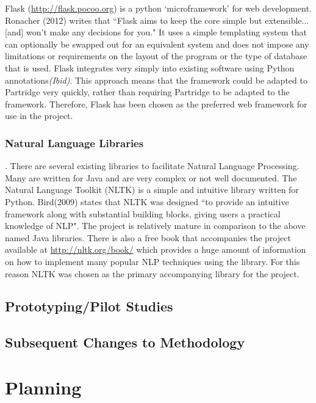 \documentclass[12pt,a4paper]{article}
\begin{document}
Flask (\url{http://flask.pocoo.org}) is a python `microframework' for web
development. Ronacher (2012) writes that ``Flask aims to keep the core simple
but extensible...[and] won't make any decisions for you\cite{flask2012}." It
uses a simple templating system that can optionally be swapped out for an
equivalent system and does not impose any limitations or requirements on the
layout of the program or the type of database that is used. Flask integrates
very simply into existing software using Python annotations\emph{(Ibid)}. This approach
means that the framework could be adapted to Partridge very quickly, rather
than requiring Partridge to be adapted to the framework. Therefore, Flask has
been chosen as the preferred web framework for use in the project.

\subsubsection{Natural Language Libraries} \label{sec:libschoice}.  There are
several existing libraries to facilitate Natural Language Processing.  Many are
written for Java \cite{mallet2002}\cite{cunningham2011text} and are very
complex or not well documented. The Natural Language Toolkit (NLTK) is a simple
and intuitive library written for Python. Bird(2009) states that NLTK was
designed ``to provide an intuitive framework along with substantial building
blocks, giving users a practical knowledge of NLP\cite{bird2009natural}". The
project is relatively mature in comparison to the above named Java libraries.
There is also a free book that accompanies the project available at
\url{http://nltk.org/book/} which provides a huge amount of information on how
to implement many popular NLP techniques using the library. For this reason
NLTK was chosen as the primary accompanying library for the project.

\subsection{Prototyping/Pilot Studies}

\subsection{Subsequent Changes to Methodology}

\section{Planning}
\end{document}
